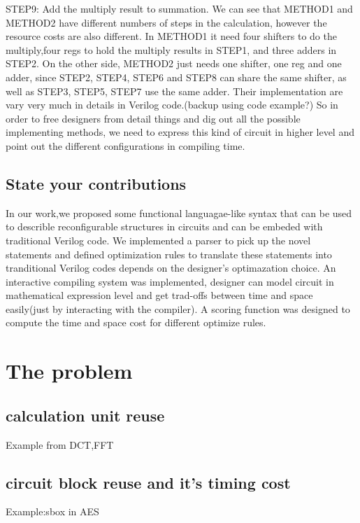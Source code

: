 \documentclass[11pt]{article} %
\begin{document}
STEP9: Add the multiply result to summation. \newline\newline
We can see that METHOD1 and METHOD2 have different numbers of steps in the calculation, however the resource costs are also different. In METHOD1 it need four shifters to do the multiply,four regs to hold the multiply results  in STEP1, and three adders in STEP2. On the other side, METHOD2 just needs one shifter, one reg and one adder, since STEP2, STEP4, STEP6 and STEP8 can share the same shifter, as well as STEP3, STEP5, STEP7 use the same adder.\newline
Their implementation are vary very much in details in Verilog code.(backup using code example?) \newline
So in order to free designers from detail things and dig out all the possible implementing methods, we need to express this kind of circuit in higher level and point out the different configurations in compiling time.\newline\newline
\subsection{State your contributions}
In our work,we proposed some functional languagae-like syntax that can be used to describle reconfigurable structures in circuits and can be embeded with traditional Verilog code. We implemented a parser to pick up the novel statements and defined optimization rules to translate these statements into tranditional Verilog codes depends on the designer's optimazation choice. An interactive compiling system was implemented, designer can model circuit in mathematical expression level and get trad-offs between time and space easily(just by interacting with the compiler). A scoring function was designed to compute the time and space cost for different optimize rules.\newline\newline 

\section{The problem}
\subsection{calculation unit reuse}
Example from DCT,FFT
\subsection{circuit block reuse and it's timing cost}
Example:sbox in AES
\end{document}
